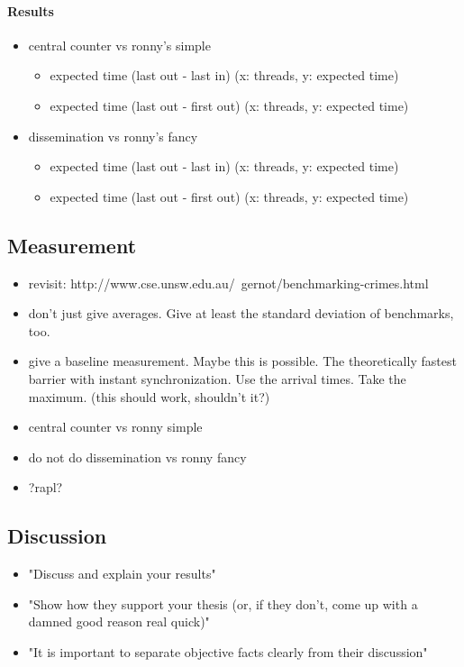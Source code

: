 \documentclass[a4paper, 10pt]{article}
\begin{document}
\begin{enumerate}
\paragraph{Results}
	\begin{itemize}
		\item central counter vs ronny's simple
			\begin{itemize}
				\item expected time (last out - last in) (x: threads, y: expected time)
				\item expected time (last out - first out) (x: threads, y: expected time)
			\end{itemize}
		\item dissemination vs ronny's fancy
			\begin{itemize}
				\item expected time (last out - last in) (x: threads, y: expected time)
				\item expected time (last out - first out) (x: threads, y: expected time)
			\end{itemize}
	\end{itemize}
\label{ssssec:analysis-modelchecking-quantitative-properties-results}

\subsection{Measurement}
\label{ssec:analysis-measurement}
\begin{itemize}
	\item revisit: http://www.cse.unsw.edu.au/~gernot/benchmarking-crimes.html
	\item don't just give averages. Give at least the standard deviation of benchmarks, too.
	\item give a baseline measurement. Maybe this is possible. The theoretically fastest barrier with instant synchronization. Use the arrival times. Take the maximum. (this should work, shouldn't it?)
	\item central counter vs ronny simple
	\item do not do dissemination vs ronny fancy
	\item ?rapl?
\end{itemize}

\subsection{Discussion}
\label{ssec:analysis-discussion}
\begin{itemize}
	\item "Discuss and explain your results"
	\item "Show how they support your thesis (or, if they don't, come up with a damned good reason real quick)"
	\item "It is important to separate objective facts clearly from their discussion"
\end{itemize}


\end{enumerate}
\end{document}

